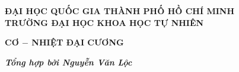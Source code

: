 \documentclass[12pt,a4paper]{book}
\begin{document}
\begin{titlepage}
\begin{center}
\textbf{ĐẠI HỌC QUỐC GIA THÀNH PHỐ HỒ CHÍ MINH}\\
\textbf{TRƯỜNG ĐẠI HỌC KHOA HỌC TỰ NHIÊN}
\end{center}
\vspace{4 cm}
\begin{center}
\fontsize{20}{16}\selectfont
\centerline{\textbf{CƠ $-$ NHIỆT ĐẠI CƯƠNG}}
\end{center}

\vspace{14 cm}
\centerline{\textbf{\textit{Tổng hợp bởi Nguyễn Văn Lộc}}}
\end{titlepage}
\tableofcontents
\newpage






\end{document}
